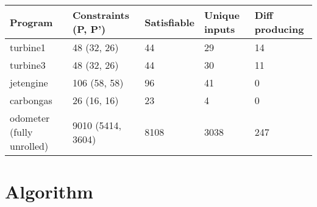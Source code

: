 \documentclass{article}
\begin{document}
\begin{table}[h]
\begin{tabular}{l|llll}
Program                   & Constraints (P, P') & Satisfiable & Unique inputs & Diff producing \\ \hline
turbine1                  & 48 (32, 26)         & 44          & 29            & 14             \\
turbine3                  & 48 (32, 26)         & 44          & 30            & 11             \\
jetengine                 & 106 (58, 58)        & 96          & 41            & 0              \\
carbongas                 & 26 (16, 16)         & 23          & 4             & 0              \\
odometer (fully unrolled) & 9010 (5414, 3604)   & 8108        & 3038          & 247
\end{tabular}
\end{table}

\section{Algorithm}
\end{document}
